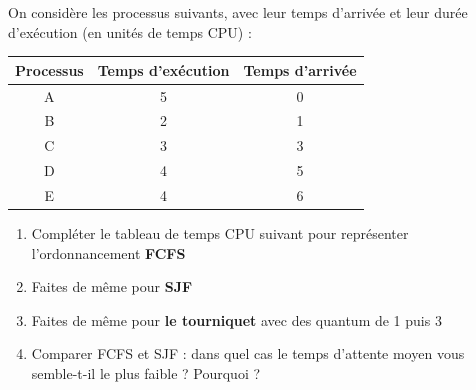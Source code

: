 \documentclass[11pt]{article}
\begin{document}
	
	On considère les processus suivants, avec leur temps d’arrivée et leur durée d’exécution (en unités de temps CPU) :
	
	\begin{center}
		\begin{tabular}{|c|c|c|}
			\hline 
			Processus & Temps d'exécution & Temps d'arrivée \\ 
			\hline 
			A & 5 & 0 \\ 
			\hline 
			B & 2 & 1 \\ 
			\hline 
			C & 3 & 3 \\ 
			\hline 
			D & 4 & 5 \\ 
			\hline 
			E & 4 & 6 \\ 
			\hline 
		\end{tabular} 
	\end{center}
	
	\begin{enumerate}
		\item Compléter le tableau de temps CPU suivant pour représenter l’ordonnancement \textbf{FCFS}
		\item Faites de même pour \textbf{SJF}
		\item Faites de même pour \textbf{le tourniquet} avec des quantum de 1 puis 3
		\item Comparer FCFS et SJF : dans quel cas le temps d’attente moyen vous semble-t-il le plus faible ? Pourquoi ?
	\end{enumerate}
	
\end{document}
